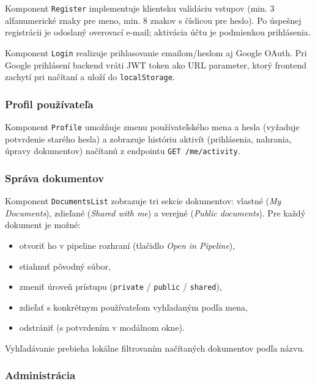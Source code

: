 Komponent \texttt{Register} implementuje klientsku validáciu vstupov (min. 3 alfanumerické znaky pre meno, min. 8 znakov s číslicou pre heslo). Po úspešnej registrácii je odoslaný overovací e-mail; aktivácia účtu je podmienkou prihlásenia.

Komponent \texttt{Login} realizuje prihlasovanie emailom/heslom aj Google OAuth. Pri Google prihlásení backend vráti JWT token ako URL parameter, ktorý frontend zachytí pri načítaní a uloží do \texttt{localStorage}.


\subsubsection{Profil používateľa}

Komponent \texttt{Profile} umožňuje zmenu používateľského mena a hesla (vyžaduje potvrdenie starého hesla) a zobrazuje históriu aktivít (prihlásenia, nahrania, úpravy dokumentov) načítanú z endpointu \texttt{GET /me/activity}.

\subsubsection{Správa dokumentov}

Komponent \texttt{DocumentsList} zobrazuje tri sekcie dokumentov: vlastné (\textit{My Documents}), zdieľané (\textit{Shared with me}) a verejné (\textit{Public documents}). Pre každý dokument je možné:
\begin{itemize}
    \item otvoriť ho v pipeline rozhraní (tlačidlo \textit{Open in Pipeline}),
    \item stiahnuť pôvodný súbor,
    \item zmeniť úroveň prístupu (\texttt{private} / \texttt{public} / \texttt{shared}),
    \item zdieľať s konkrétnym používateľom vyhľadaným podľa mena,
    \item odstrániť (s potvrdením v modálnom okne).
\end{itemize}
Vyhľadávanie prebieha lokálne filtrovaním načítaných dokumentov podľa názvu.


\subsubsection{Administrácia}

